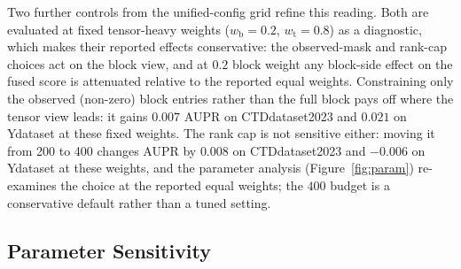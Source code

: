 \documentclass[webpdf,modern,large]{oup-authoring-template}
\begin{document}
Two further controls from the unified-config grid refine this reading. Both are evaluated at fixed tensor-heavy weights ($w_{\text{b}}=0.2$, $w_{\text{t}}=0.8$) as a diagnostic, which makes their reported effects conservative: the observed-mask and rank-cap choices act on the block view, and at $0.2$ block weight any block-side effect on the fused score is attenuated relative to the reported equal weights. Constraining only the observed (non-zero) block entries rather than the full block pays off where the tensor view leads: it gains $0.007$ AUPR on CTDdataset2023 and $0.021$ on Ydataset at these fixed weights. The rank cap is not sensitive either: moving it from 200 to 400 changes AUPR by $0.008$ on CTDdataset2023 and $-0.006$ on Ydataset at these weights, and the parameter analysis (Figure~\ref{fig:param}) re-examines the choice at the reported equal weights; the $400$ budget is a conservative default rather than a tuned setting.

\subsection{Parameter Sensitivity}
\label{sec:param}
\end{document}
